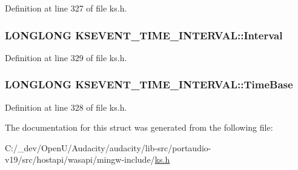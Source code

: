 Definition at line 327 of file ks.\+h.

\subsubsection[{\texorpdfstring{Interval}{Interval}}]{\setlength{\rightskip}{0pt plus 5cm}L\+O\+N\+G\+L\+O\+NG K\+S\+E\+V\+E\+N\+T\+\_\+\+T\+I\+M\+E\+\_\+\+I\+N\+T\+E\+R\+V\+A\+L\+::\+Interval}\hypertarget{struct_k_s_e_v_e_n_t___t_i_m_e___i_n_t_e_r_v_a_l_a6f91ab1972457e0dab0e3d1d5a4b22be}{}\label{struct_k_s_e_v_e_n_t___t_i_m_e___i_n_t_e_r_v_a_l_a6f91ab1972457e0dab0e3d1d5a4b22be}


Definition at line 329 of file ks.\+h.

\subsubsection[{\texorpdfstring{Time\+Base}{TimeBase}}]{\setlength{\rightskip}{0pt plus 5cm}L\+O\+N\+G\+L\+O\+NG K\+S\+E\+V\+E\+N\+T\+\_\+\+T\+I\+M\+E\+\_\+\+I\+N\+T\+E\+R\+V\+A\+L\+::\+Time\+Base}\hypertarget{struct_k_s_e_v_e_n_t___t_i_m_e___i_n_t_e_r_v_a_l_a57ee4698d8bdb3705951590c038ac21b}{}\label{struct_k_s_e_v_e_n_t___t_i_m_e___i_n_t_e_r_v_a_l_a57ee4698d8bdb3705951590c038ac21b}


Definition at line 328 of file ks.\+h.



The documentation for this struct was generated from the following file\+:\begin{DoxyCompactItemize}
\item 
C\+:/\+\_\+dev/\+Open\+U/\+Audacity/audacity/lib-\/src/portaudio-\/v19/src/hostapi/wasapi/mingw-\/include/\hyperlink{ks_8h}{ks.\+h}\end{DoxyCompactItemize}
